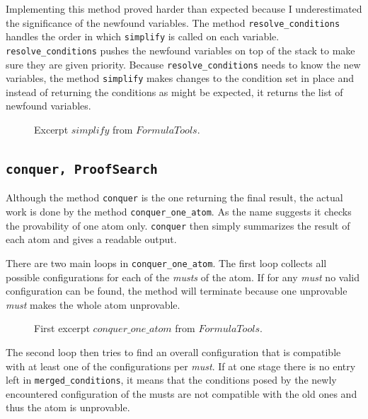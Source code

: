 Implementing this method proved harder than expected because I underestimated the significance of the newfound variables. The method \texttt{resolve\_conditions} handles the order in which \texttt{simplify} is called on each variable. \texttt{resolve\_conditions} pushes the newfound variables on top of the stack to make sure they are given priority. Because \texttt{resolve\_conditions} needs to know the new variables, the method \texttt{simplify} makes changes to the condition set in place and instead of returning the conditions as might be expected, it returns the list of newfound variables.

\begin{figure}[H]
	\caption{Excerpt $simplify$ from $FormulaTools$.}
	\vspace{-10pt}
	
	\vspace{-10pt}
\end{figure}


\subsection[conquer]{\texttt{conquer, ProofSearch}}
Although the method \texttt{conquer} is the one returning the final result, the actual work is done by the method \texttt{conquer\_one\_atom}. As the name suggests it checks the provability of one atom only. \texttt{conquer} then simply summarizes the result of each atom and gives a readable output.

There are two main loops in \texttt{conquer\_one\_atom}. The first loop collects all possible configurations for each of the \emph{musts} of the atom. If for any \emph{must} no valid configuration can be found, the method will terminate because one unprovable \emph{must} makes the whole atom unprovable.

\begin{figure}[H]
	\caption{First excerpt $conquer\_one\_ atom$ from $FormulaTools$.}
	\vspace{-10pt}
	
	\vspace{-10pt}
\end{figure}

The second loop then tries to find an overall configuration that is compatible with at least one of the configurations per \emph{must}. If at one stage there is no entry left in \texttt{merged\_conditions}, it means that the conditions posed by the newly encountered configuration of the musts are not compatible with the old ones and thus the atom is unprovable.

